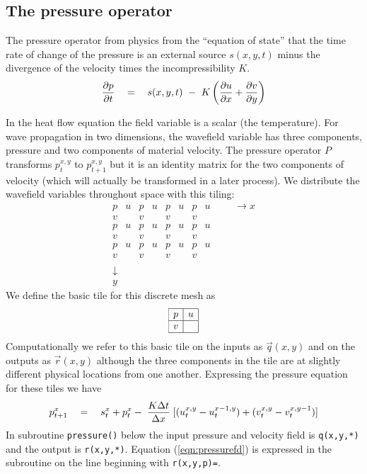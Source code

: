 \subsection{The pressure operator}
The pressure operator from physics from the
``equation of state''
that the time rate of change of the pressure
is an external source $s(x,y,t)$ minus
the divergence of the velocity times the incompressibility $K$.
\begin{equation}
{\partial p \over \partial t} \eq
s(x,y,t)
\ -\ 
K \left(
{\partial u \over \partial x} +
{\partial v \over \partial y}
\right)
\end{equation}
\par
In the heat flow equation the field variable
is a scalar (the temperature).
For wave propagation in two dimensions,
the wavefield variable has three components,
pressure and two components of material velocity.
The pressure operator $P$ transforms
$p_{t}^{x,y}$ to $p_{t+1}^{x,y}$
but it is an identity matrix
for the two components of velocity
(which will actually be transformed in a later process).
We distribute the wavefield variables throughout space with this tiling:
\begin{equation}
    \begin{array}{ccccccccccccccccccccccc}
	p&u& p&u& p&u& p&u& & &\longrightarrow x\\
	v& & v& & v& & v& & \\
	p&u& p&u& p&u& p&u& \\
	v& & v& & v& & v& & \\
	p&u& p&u& p&u& p&u& \\
	v& & v& & v& & v& & \\
	\\
        \downarrow &&&&&&&& \\
	y
    \end{array}
\end{equation}
We define the basic tile for this discrete mesh as
\begin{equation}
            \begin{array}{|c|c|}
                                \hline
                                p & u \\
                                \hline
                                v &   \\
                                \hline
                        \end{array}
\end{equation}
Computationally we refer to this basic tile on the inputs as $\vec q(x,y)$
and on the outputs as $\vec r(x,y)$
although the three components in the tile
are at slightly different physical locations
from one another.
Expressing the pressure equation for these tiles we have
\begin{equation}
p_{t+1}^x \quad =\quad  s_t^x + p_t^x
	- \;
	 {K \Delta t  \over \Delta x} \;
		[ 
		(u_t^{x,y}-u_t^{x-1,y}) 
		+
		(v_t^{x,y}-v_t^{x,y-1}) 
		]
\label{eqn:pressurefd}
\end{equation}
In subroutine {\tt pressure()} below
the input pressure and velocity field is {\tt q(x,y,*)}
and the output is {\tt r(x,y,*)}.
Equation (\ref{eqn:pressurefd}) is expressed in the subroutine
on the line beginning with
{\tt r(x,y,p)=}.

